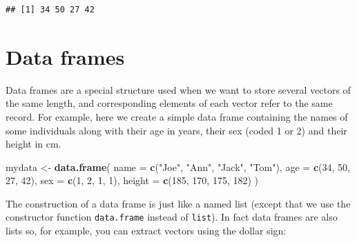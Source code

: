 \documentclass[
]{book}
\newenvironment{Shaded}{\begin{snugshade}}{\end{snugshade}}
\newcommand{\AttributeTok}[1]{\textcolor[rgb]{0.13,0.29,0.53}{#1}}
\newcommand{\DecValTok}[1]{\textcolor[rgb]{0.00,0.00,0.81}{#1}}
\newcommand{\FunctionTok}[1]{\textcolor[rgb]{0.13,0.29,0.53}{\textbf{#1}}}
\newcommand{\NormalTok}[1]{#1}
\newcommand{\OtherTok}[1]{\textcolor[rgb]{0.56,0.35,0.01}{#1}}
\newcommand{\SpecialCharTok}[1]{\textcolor[rgb]{0.81,0.36,0.00}{\textbf{#1}}}
\newcommand{\StringTok}[1]{\textcolor[rgb]{0.31,0.60,0.02}{#1}}
\begin{document}
\begin{Shaded}
\end{Shaded}

\begin{verbatim}
## [1] 34 50 27 42
\end{verbatim}

\section{Data frames}\label{data-frames}

Data frames are a special structure used when we want to store several vectors of the
same length, and corresponding elements of each vector refer to the same record.
For example, here we create a simple data frame containing the names of some individuals
along with their age in years, their sex (coded 1 or 2) and their height in cm.

\begin{Shaded}
\begin{Highlighting}[]
\NormalTok{mydata }\OtherTok{\textless{}{-}} \FunctionTok{data.frame}\NormalTok{(}
  \AttributeTok{name =} \FunctionTok{c}\NormalTok{(}\StringTok{"Joe"}\NormalTok{, }\StringTok{"Ann"}\NormalTok{, }\StringTok{"Jack"}\NormalTok{, }\StringTok{"Tom"}\NormalTok{),}
  \AttributeTok{age =} \FunctionTok{c}\NormalTok{(}\DecValTok{34}\NormalTok{, }\DecValTok{50}\NormalTok{, }\DecValTok{27}\NormalTok{, }\DecValTok{42}\NormalTok{), }
  \AttributeTok{sex =} \FunctionTok{c}\NormalTok{(}\DecValTok{1}\NormalTok{, }\DecValTok{2}\NormalTok{, }\DecValTok{1}\NormalTok{, }\DecValTok{1}\NormalTok{),}
  \AttributeTok{height =} \FunctionTok{c}\NormalTok{(}\DecValTok{185}\NormalTok{, }\DecValTok{170}\NormalTok{, }\DecValTok{175}\NormalTok{, }\DecValTok{182}\NormalTok{)}
\NormalTok{)}
\end{Highlighting}
\end{Shaded}

The construction of a data frame is just like a named list (except
that we use the constructor function \texttt{data.frame} instead of \texttt{list}). In fact data frames are also lists so, for example, you can
extract vectors using the dollar sign:

\begin{Shaded}
\end{Shaded}
\end{document}
